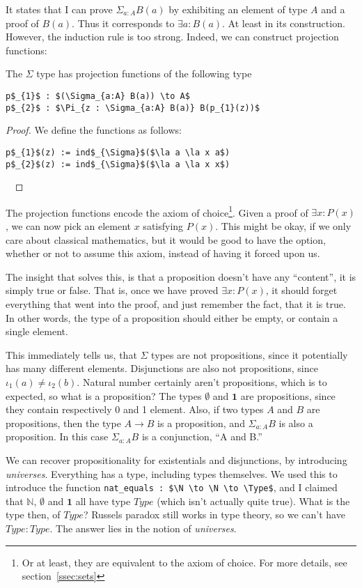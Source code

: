 \documentclass[a4paper, 12pt]{article}
\newcommand{\N}{\mathbb{N}}
\newcommand{\Type}{\mathit{Type}}
\newcommand{\la}[1]{\lambda{#1}.\,}
\theoremstyle{changedot}
\theoremstyle{changedotbreak}
\theoremstyle{nonumberplain}
\newtheorem{proof}{Proof}
\begin{document}
It states that I can prove $\Sigma_{a:A}B(a)$ by exhibiting an element of type $A$ and a proof of $B(a)$. Thus it corresponds to $\exists a: B(a)$. At least in its construction. However, the induction rule is too strong. Indeed, we can construct projection functions:

\begin{theorem}
  The $\Sigma$ type has projection functions of the following type
\begin{lstlisting}
p$_{1}$ : $(\Sigma_{a:A} B(a)) \to A$
p$_{2}$ : $\Pi_{z : \Sigma_{a:A} B(a)} B(p_{1}(z))$
\end{lstlisting}
\end{theorem}
\begin{proof}
  We define the functions as follows:
\begin{lstlisting}
p$_{1}$(z) := ind$_{\Sigma}$($\la a \la x a$)
p$_{2}$(z) := ind$_{\Sigma}$($\la a \la x x$)
\end{lstlisting}
~
\end{proof}

The projection functions encode the axiom of choice\footnote{Or at least, they are equivalent to the axiom of choice. For more details, see section~\ref{ssec:sets}}. Given a proof of $\exists x: P(x)$, we can now pick an element $x$ satisfying $P(x)$. This might be okay, if we only care about classical mathematics, but it would be good to have the option, whether or not to assume this axiom, instead of having it forced upon us.

The insight that solves this, is that a proposition doesn't have any ``content'', it is simply true or false. That is, once we have proved $\exists x: P(x)$, it should forget everything that went into the proof, and just remember the fact, that it is true. In other words, the type of a proposition should either be empty, or contain a single element.

This immediately tells us, that $\Sigma$ types are not propositions, since it potentially has many different elements. Disjunctions are also not propositions, since $\iota_{1}(a) \neq \iota_{2}(b)$. Natural number certainly aren't propositions, which is to expected, so what is a proposition? The types $\emptyset$ and $\mathbf 1$ are propositions, since they contain respectively 0 and 1 element. Also, if two types $A$ and $B$ are propositions, then the type $A \to B$ is a proposition, and $\Sigma_{a:A}B$ is also a proposition. In this case $\Sigma_{a:A}B$ is a conjunction, ``A and B.''

We can recover propositionality for existentials and disjunctions, by introducing \textit{universes}. Everything has a type, including types themselves. We used this to introduce the function \lstinline{nat_equals : $\N \to \N \to \Type$}, and I claimed that $\N$, $\emptyset$ and $\mathbf 1$ all have type $\Type$ (which isn't actually quite true). What is the type then, of $\Type$? Russels paradox still works in type theory, so we can't have $\Type : \Type$. The answer lies in the notion of \textit{universes}.
\end{document}
